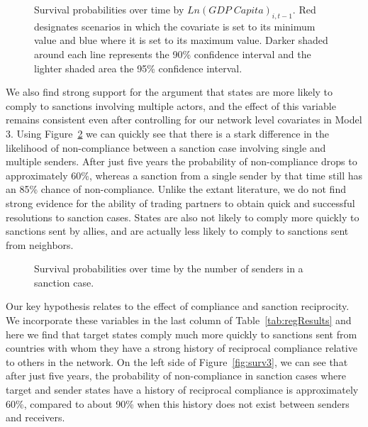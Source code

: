 \begin{figure}[ht]
	\centering
	\caption{Survival probabilities over time by $Ln(GDP \; Capita)_{i,t-1}$. Red designates scenarios in which the covariate is set to its minimum value and blue where it is set to its maximum value. Darker shaded around each line represents the 90\% confidence interval and the lighter shaded area the 95\% confidence interval.}

        \resizebox{.55\textwidth}{!}{}	


	
	\label{fig:monSurv}
\end{figure}

We also find strong support for the argument that states are more likely to comply to sanctions involving multiple actors, and the effect of this variable remains consistent even after controlling for our network level covariates in Model 3. Using Figure~\ref{fig:nosSurv} we can quickly see that there is a stark difference in the likelihood of non-compliance between a sanction case involving single and multiple senders. After just five years the probability of non-compliance drops to approximately 60\%, whereas a sanction from a single sender by that time still has an 85\% chance of non-compliance. Unlike the extant literature, we do not find strong evidence for the ability of trading partners to obtain quick and successful resolutions to sanction cases. States are also not likely to comply more quickly to sanctions sent by allies, and are actually less likely to comply to sanctions sent from neighbors. 

\begin{figure}[ht]
	\centering
	\caption{Survival probabilities over time by the number of senders in a sanction case.}
	\resizebox{0.55\textwidth}{!}{}
	\label{fig:nosSurv}
\end{figure}

Our key hypothesis relates to the effect of compliance and sanction reciprocity. We incorporate these variables in the last column of Table~\ref{tab:regResults} and here we find that target states comply much more quickly to sanctions sent from countries with whom they have a strong history of reciprocal compliance relative to others in the network. On the left side of Figure~\ref{fig:surv3}, we can see that after just five years, the probability of non-compliance in sanction cases where target and sender states have a history of reciprocal compliance is approximately 60\%, compared to about 90\% when this history does not exist between senders and receivers. 


